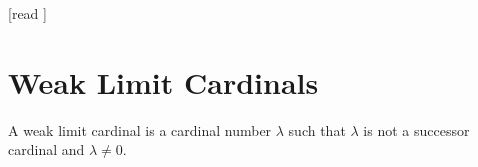 \documentclass[10pt]{article}
\begin{document}
  \begin{imports}
    \begin{forthel}
      [read ]
    \end{forthel}
  \end{imports}


  \section*{Weak Limit Cardinals}

  \begin{forthel}
    \begin{definition}[id=SET_THEORY_06_8945210236547450,printid]
      A weak limit cardinal is a cardinal number $\lambda$ such that $\lambda$ is not a successor cardinal and $\lambda \neq 0$.
    \end{definition}
  \end{forthel}
\end{document}
